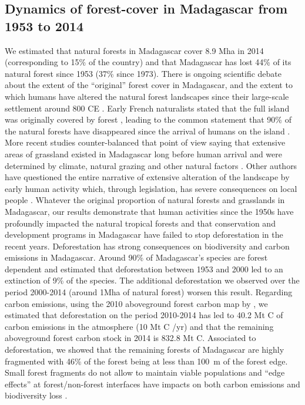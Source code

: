 \documentclass[a4paper, 12pt, leqno]{article} %
\begin{document}
\subsection{Dynamics of forest-cover in Madagascar from 1953 to 2014}

We estimated that natural forests in Madagascar cover 8.9 Mha in 2014
(corresponding to 15\% of the country) and that Madagascar has lost
44\% of its natural forest since 1953 (37\% since 1973). There is
ongoing scientific debate about the extent of the ``original'' forest
cover in Madagascar, and the extent to which humans have altered the
natural forest landscapes since their large-scale settlement around
800 CE \citep{Burns2016, Cox2012}. Early French naturalists stated
that the full island was originally covered by forest
\citep{Humbert1927, Perrier1921}, leading to the common statement that
90\% of the natural forests have disappeared since the arrival of
humans on the island \citep{Kull2000}. More recent studies
counter-balanced that point of view saying that extensive areas of
grassland existed in Madagascar long before human arrival and were
determined by climate, natural grazing and other natural factors
\citep{Vorontsova2017, Virah-Sawmy2009}. Other authors have questioned
the entire narrative of extensive alteration of the landscape by early
human activity which, through legislation, has severe consequences on
local people \citep{Klein2002, Kull2000}. Whatever the original
proportion of natural forests and grasslands in Madagascar, our
results demonstrate that human activities since the 1950s have
profoundly impacted the natural tropical forests and that conservation
and development programs in Madagascar have failed to stop
deforestation in the recent years. Deforestation has strong
consequences on biodiversity and carbon emissions in
Madagascar. Around 90\% of Madagascar's species are forest dependent
\citep{Allnutt2008, Goodman2005} and \citet{Allnutt2008} estimated
that deforestation between 1953 and 2000 led to an extinction of 9\%
of the species. The additional deforestation we observed over the
period 2000-2014 (around 1Mha of natural forest) worsen this
result. Regarding carbon emissions, using the 2010 aboveground forest
carbon map by \citet{Vieilledent2016}, we estimated that deforestation
on the period 2010-2014 has led to 40.2 Mt C of carbon emissions in
the atmosphere (10 Mt C /yr) and that the remaining aboveground forest
carbon stock in 2014 is 832.8 Mt C. Associated to deforestation, we
showed that the remaining forests of Madagascar are highly fragmented
with 46\% of the forest being at less than 100~m of the forest
edge. Small forest fragments do not allow to maintain viable
populations and ``edge effects'' at forest/non-forest interfaces have
impacts on both carbon emissions \citep{Brinck2017} and biodiversity
loss \citep{Gibson2013, Murcia1995}.
\end{document}

